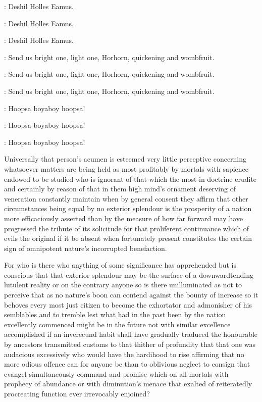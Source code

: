 \pagebreak


: Deshil Holles Eamus.

: Deshil Holles Eamus.

: Deshil Holles Eamus.

: Send us bright one, light one, Horhorn, quickening and wombfruit.

: Send us bright one, light one, Horhorn, quickening and wombfruit.

: Send us bright one, light one, Horhorn, quickening and wombfruit.

\Nurses: Hoopsa boyaboy hoopsa!

\Nurses: Hoopsa boyaboy hoopsa!

\Nurses: Hoopsa boyaboy hoopsa!


Universally that person's acumen is esteemed very little perceptive
concerning whatsoever matters are being held as most profitably by mortals
with sapience endowed to be studied who is ignorant of that which the most
in doctrine erudite and certainly by reason of that in them high mind's
ornament deserving of veneration constantly maintain when by general
consent they affirm that other circumstances being equal by no exterior
splendour is the prosperity of a nation more efficaciously asserted than
by the measure of how far forward may have progressed the tribute of its
solicitude for that proliferent continuance which of evils the original if
it be absent when fortunately present constitutes the certain sign of
omnipotent nature's incorrupted benefaction.

For who is there who anything
of some significance has apprehended but is conscious that that exterior
splendour may be the surface of a downwardtending lutulent reality or on
the contrary anyone so is there unilluminated as not to perceive that as
no nature's boon can contend against the bounty of increase so it behoves
every most just citizen to become the exhortator and admonisher of his
semblables and to tremble lest what had in the past been by the nation
excellently commenced might be in the future not with similar excellence
accomplished if an inverecund habit shall have gradually traduced the
honourable by ancestors transmitted customs to that thither of profundity
that that one was audacious excessively who would have the hardihood to
rise affirming that no more odious offence can for anyone be than to
oblivious neglect to consign that evangel simultaneously command and
promise which on all mortals with prophecy of abundance or with
diminution's menace that exalted of reiteratedly procreating function ever
irrevocably enjoined?

